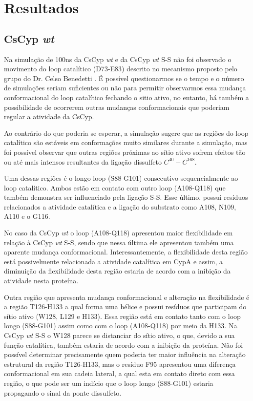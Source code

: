 
\section*{Resultados}

\subsection*{CsCyp \textit{wt}}

 Na simulação de 100ns da CsCyp \textit{wt} e da CsCyp \textit{wt} S-S não foi observado o movimento do loop catalítico (D73-E83) descrito no mecanismo proposto pelo grupo do Dr. Celso Benedetti \citep{Campos2013}. É possível questionarmos se o tempo e o número de simulações seriam suficientes ou não para permitir observarmos essa mudança conformacional do loop catalítico fechando o sitio ativo, no entanto, há também a possibilidade de ocorrerem outras mudanças conformacionais que poderiam regular a atividade da CsCyp.
 
 Ao contrário do que poderia se esperar, a simulação sugere que as regiões do loop catalítico são estáveis em conformações muito similares durante a simulação, mas foi possível observar que outras regiões próximas ao sítio ativo sofrem efeitos tão ou até mais intensos resultantes da ligação dissulfeto $C^{40}-C^{168}$.

Uma dessas regiões é o longo loop (S88-G101) consecutivo sequencialmente ao loop catalítico. Ambos estão em contato com outro loop (A108-Q118) que também demonstra ser influenciado pela ligação S-S. Esse último, possui resíduos relacionados a atividade catalítica e a ligação do substrato como A108, N109, A110 e o G116. 

No caso da CsCyp \textit{wt} o loop (A108-Q118) apresentou maior flexibilidade em relação à CsCyp \textit{wt} S-S, sendo que nessa última ele apresentou também uma aparente mudança conformacional. Interessantemente, a flexibilidade desta região está possivelmente relacionada a atividade catalítica em CypA \citep{Eisenmesser2002} e assim, a diminuição da flexibilidade desta região estaria de acordo com a inibição da atividade nesta proteína.

Outra região que apresenta mudança conformacional e alteração na flexibilidade é a região T126-H133 a qual forma uma hélice e possui resíduos que participam do sítio ativo (W128, L129 e H133). Essa região está em contato tanto com o loop longo (S88-G101) assim como com o loop (A108-Q118) por meio da H133. Na CsCyp \textit{wt} S-S o W128 parece se distanciar do sítio ativo, o que, devido a sua função catalítica, também estaria de acordo com a inibição da proteína. Não foi possível determinar precisamente quem poderia ter maior influência na alteração estrutural da região T126-H133, mas o resíduo F95 apresentou uma diferença conformacional em sua cadeia lateral, a qual esta em contato direto com essa região, o que pode ser um indício que o loop longo (S88-G101) estaria propagando o sinal da ponte dissulfeto.



